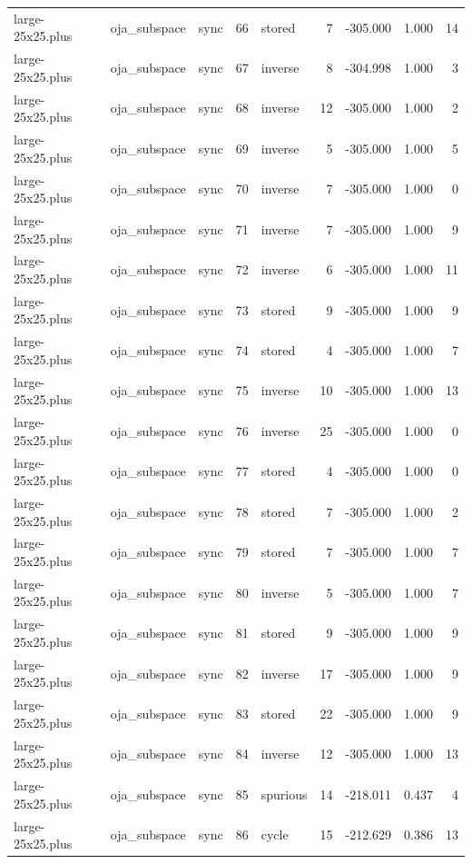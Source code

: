 \begin{tabular}{lllrlrrrr}
large-25x25.plus & oja\_subspace & sync & 66 & stored & 7 & -305.000 & 1.000 & 14 \\
large-25x25.plus & oja\_subspace & sync & 67 & inverse & 8 & -304.998 & 1.000 & 3 \\
large-25x25.plus & oja\_subspace & sync & 68 & inverse & 12 & -305.000 & 1.000 & 2 \\
large-25x25.plus & oja\_subspace & sync & 69 & inverse & 5 & -305.000 & 1.000 & 5 \\
large-25x25.plus & oja\_subspace & sync & 70 & inverse & 7 & -305.000 & 1.000 & 0 \\
large-25x25.plus & oja\_subspace & sync & 71 & inverse & 7 & -305.000 & 1.000 & 9 \\
large-25x25.plus & oja\_subspace & sync & 72 & inverse & 6 & -305.000 & 1.000 & 11 \\
large-25x25.plus & oja\_subspace & sync & 73 & stored & 9 & -305.000 & 1.000 & 9 \\
large-25x25.plus & oja\_subspace & sync & 74 & stored & 4 & -305.000 & 1.000 & 7 \\
large-25x25.plus & oja\_subspace & sync & 75 & inverse & 10 & -305.000 & 1.000 & 13 \\
large-25x25.plus & oja\_subspace & sync & 76 & inverse & 25 & -305.000 & 1.000 & 0 \\
large-25x25.plus & oja\_subspace & sync & 77 & stored & 4 & -305.000 & 1.000 & 0 \\
large-25x25.plus & oja\_subspace & sync & 78 & stored & 7 & -305.000 & 1.000 & 2 \\
large-25x25.plus & oja\_subspace & sync & 79 & stored & 7 & -305.000 & 1.000 & 7 \\
large-25x25.plus & oja\_subspace & sync & 80 & inverse & 5 & -305.000 & 1.000 & 7 \\
large-25x25.plus & oja\_subspace & sync & 81 & stored & 9 & -305.000 & 1.000 & 9 \\
large-25x25.plus & oja\_subspace & sync & 82 & inverse & 17 & -305.000 & 1.000 & 9 \\
large-25x25.plus & oja\_subspace & sync & 83 & stored & 22 & -305.000 & 1.000 & 9 \\
large-25x25.plus & oja\_subspace & sync & 84 & inverse & 12 & -305.000 & 1.000 & 13 \\
large-25x25.plus & oja\_subspace & sync & 85 & spurious & 14 & -218.011 & 0.437 & 4 \\
large-25x25.plus & oja\_subspace & sync & 86 & cycle & 15 & -212.629 & 0.386 & 13 \\

\end{tabular}
